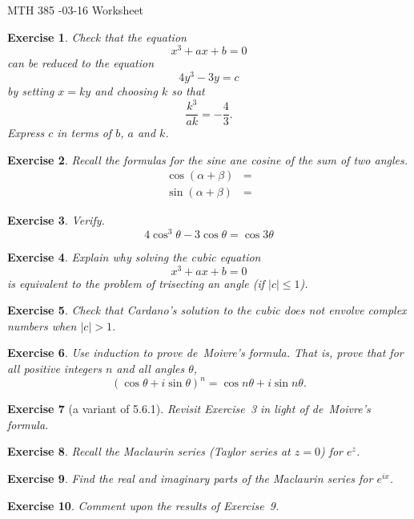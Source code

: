 \documentclass[12pt]{article}
\theoremstyle{plain}
\newtheorem{ex}{Exercise}
\begin{document}
MTH 385 -03-16 Worksheet

\begin{ex}
  Check that the equation
  \[
    x^3+ax+b=0
  \]
  can be reduced to the equation
  \[
    4y^3-3y=c
  \]
  by setting $x=ky$ and choosing $k$ so that
  \[
    \frac{k^3}{ak}=-\frac{4}{3}.
  \]
  Express $c$ in terms of $b$, $a$ and $k$.
\end{ex}

\begin{ex}
  Recall the formulas for the sine ane cosine of the sum of two angles.
  \begin{align*}
    \cos(\alpha+\beta) &= \\
    \sin(\alpha+\beta) &=
  \end{align*}
\end{ex}

\begin{ex}
  Verify.
  \[
    4\cos^3\theta-3\cos\theta=\cos3\theta
  \]
\end{ex}

\begin{ex}
  Explain why solving the cubic equation
  \[
    x^3+ax+b=0
  \]
  is equivalent to the problem of trisecting an angle (if $|c|\leq1$).
\end{ex}

\begin{ex}
  Check that Cardano's solution to the cubic does not envolve complex numbers when $|c|>1$.
\end{ex}

\begin{ex}
  Use induction to prove de~Moivre's formula. That is, prove that for all positive integers $n$ and all angles $\theta$,
  \[
    (\cos\theta+i\sin\theta)^n=\cos n\theta+i\sin n\theta.
  \]
\end{ex}

\begin{ex} [a variant of 5.6.1]
  Revisit Exercise~3 in light of de~Moivre's formula.
\end{ex}

\begin{ex} 
  Recall the Maclaurin series (Taylor series at $z=0$) for $e^z$.
\end{ex}

\begin{ex} 
  Find the real and imaginary parts of the Maclaurin series for $e^{ix}$.
\end{ex}

\begin{ex}
  Comment upon the results of Exercise~9.
\end{ex}
\end{document}
